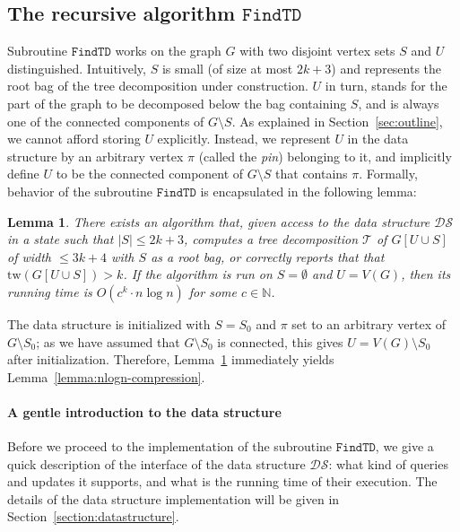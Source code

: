 \documentclass[a4paper,11pt]{article}
\newtheorem{lemma}{Lemma}[section]
\theoremstyle{definition}
\theoremstyle{remark}
\newcommand{\findTD}{\mathtt{FindTD}}
\newcommand{\ds}{\mathcal{DS}}
\newcommand{\pin}{\pi}
\newcommand{\td}{\mathcal{T}} \newcommand{\tw}{\mathrm{tw}} \newcommand{\w}{\mathrm{w}}
\begin{document}
\subsection{The recursive algorithm
  $\findTD$}\label{section:findTDlogn}

Subroutine $\findTD$ works on the graph $G$ with two disjoint vertex
sets $S$ and $U$ distinguished.  Intuitively, $S$ is small (of size at
most $2k+3$) and represents the root bag of the tree decomposition
under construction.  $U$ in turn, stands for the part of the graph to
be decomposed below the bag containing $S$, and is always one of the
connected components of $G\setminus S$.  As explained in
Section~\ref{sec:outline}, we cannot afford storing $U$ explicitly.
Instead, we represent $U$ in the data structure by an arbitrary vertex
$\pin$ (called the {\emph{pin}}) belonging to it, and implicitly
define $U$ to be the connected component of $G\setminus S$ that
contains $\pin$.  Formally, behavior of the subroutine $\findTD$ is
encapsulated in the following lemma:

\begin{lemma}
  \label{lemma:nlogn-s-root-bag}
  There exists an algorithm that, given access to the data structure
  $\ds$ in a state such that $|S| \leq 2k+3$, computes a tree
  decomposition $\td$ of $G[U \cup S]$ of width $\leq 3k + 4$ with $S$
  as a root bag, or correctly reports that that $\tw(G[U \cup S]) >
  k$.  If the algorithm is run on $S=\emptyset$ and $U=V(G)$, then its
  running time is $O(c^k\cdot n\log n)$ for some $c \in \mathbb{N}$.
\end{lemma}

The data structure is initialized with $S=S_0$ and $\pin$ set to an
arbitrary vertex of $G\setminus S_0$; as we have assumed that
$G\setminus S_0$ is connected, this gives $U=V(G)\setminus S_0$ after
initialization.  Therefore, Lemma~\ref{lemma:nlogn-s-root-bag}
immediately yields Lemma~\ref{lemma:nlogn-compression}.

\paragraph{A gentle introduction to the data structure}
Before we proceed to the implementation of the subroutine $\findTD$,
we give a quick description of the interface of the data structure
$\ds$: what kind of queries and updates it supports, and what is the
running time of their execution.  The details of the data structure
implementation will be given in Section~\ref{section:datastructure}.
\end{document}
